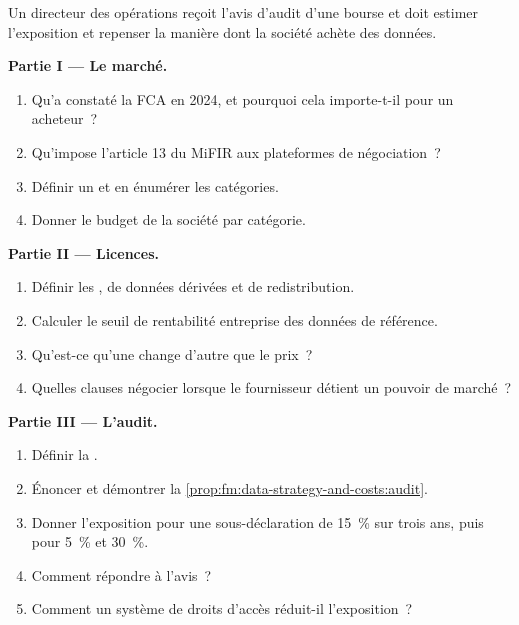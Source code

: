 \begin{problem}\label{pb:fm:data-strategy-and-costs:1}
Un directeur des opérations reçoit l'avis d'audit d'une bourse et doit estimer l'exposition et repenser la manière dont la société achète des données.

\medskip\noindent\textbf{Partie I --- Le marché.}
\begin{enumerate}
\item Qu'a constaté la FCA en 2024, et pourquoi cela importe-t-il pour un acheteur~?
\item Qu'impose l'article 13 du MiFIR aux plateformes de négociation~?
\item Définir un  et en énumérer les catégories.
\item Donner le budget de la société par catégorie.
\end{enumerate}

\medskip\noindent\textbf{Partie II --- Licences.}
\begin{enumerate}[resume]
\item Définir les , de données dérivées et de redistribution.
\item Calculer le seuil de rentabilité entreprise des données de référence.
\item Qu'est-ce qu'une  change d'autre que le prix~?
\item Quelles clauses négocier lorsque le fournisseur détient un pouvoir de marché~?
\end{enumerate}

\medskip\noindent\textbf{Partie III --- L'audit.}
\begin{enumerate}[resume]
\item Définir la .
\item Énoncer et démontrer la \cref{prop:fm:data-strategy-and-costs:audit}.
\item Donner l'exposition pour une sous-déclaration de 15~\% sur trois ans, puis pour 5~\% et 30~\%.
\item Comment répondre à l'avis~?
\item Comment un système de droits d'accès réduit-il l'exposition~?
\end{enumerate}


\end{problem}
